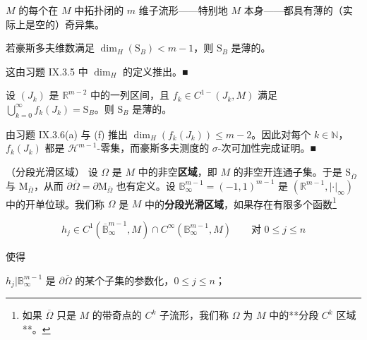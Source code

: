 \begin{example}

\begin{items}
\item

$ M $ 的每个在 $ M $ 中拓扑闭的 $ m $ 维子流形——特别地 $ M $ 本身——都具有薄的（实际上是空的）奇异集。

\item

若豪斯多夫维数满足 $ \dim_H(\mathrm{S}_B) < m-1 $，则 $ \mathrm{S}_B $ 是薄的。

\proofhead
这由习题 IX.3.5 中 $ \dim_H $ 的定义推出。\nobreak\hspace{0.35em}■
\item

设 $ (J_k) $ 是 $ \mathbb{R}^{m-2} $ 中的一列区间，且 $ f_k \in C^{1-}(J_k, M) $ 满足 $ \bigcup_{k=0}^{\infty} f_k(J_k) = \mathrm{S}_B $。则 $ \mathrm{S}_B $ 是薄的。

\proofhead
由习题 IX.3.6(a) 与 (f) 推出 $ \dim_H(f_k(J_k)) \le m-2 $。因此对每个 $ k \in \mathbb{N} $，$ f_k(J_k) $ 都是 $ \mathcal{H}^{m-1} $-零集，而豪斯多夫测度的 $ \sigma $-次可加性完成证明。\nobreak\hspace{0.35em}■
\end{items}

\begin{items}
\item[（d）]

（分段光滑区域） 设 $ \Omega $ 是 $ M $ 中的非空\textbf{区域}，即 $ M $ 的非空开连通子集。于是 $ \mathrm{S}_{\overline{\Omega}} $ 与 $ \mathrm{M}_{\overline{\Omega}} $，从而 $ \partial\overline{\Omega} = \partial\mathrm{M}_{\overline{\Omega}} $ 也有定义。设 $ \mathbb{B}_\infty^{m-1} = (-1,1)^{m-1} $ 是 $ (\mathbb{R}^{m-1}, |\cdot|_\infty) $ 中的开单位球。我们称 $ \Omega $ 是 $ M $ 中的\textbf{分段光滑区域}，如果存在有限多个函数\footnote{如果 $ \overline{\Omega} $ 只是 $ M $ 的带奇点的 $ C^k $ 子流形，我们称 $ \Omega $ 为 $ M $ 中的**分段 $ C^k $ 区域**。}

\[
h_j \in C^1(\overline{\mathbb{B}}_\infty^{m-1}, M) \cap C^\infty(\mathbb{B}_\infty^{m-1}, M) \qquad \text{对 } 0 \le j \le n
\]

使得

\begin{subitems}
\item

$ h_j|\mathbb{B}_\infty^{m-1} $ 是 $ \partial\overline{\Omega} $ 的某个子集的参数化，$ 0 \le j \le n $；


\end{subitems}
\end{items}
\end{example}
